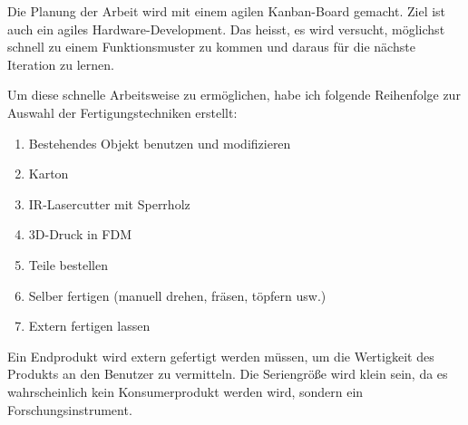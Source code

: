 

Die Planung der Arbeit wird mit einem agilen Kanban-Board gemacht. Ziel ist auch ein agiles Hardware-Development. Das heisst, es wird versucht, möglichst schnell zu einem Funktionsmuster zu kommen und daraus für die nächste Iteration zu lernen.

Um diese schnelle Arbeitsweise zu ermöglichen, habe ich folgende Reihenfolge zur Auswahl der Fertigungstechniken erstellt:

\begin{enumerate}
\item Bestehendes Objekt benutzen und modifizieren
\item Karton
\item IR-Lasercutter mit Sperrholz
\item 3D-Druck in FDM
\item Teile bestellen
\item Selber fertigen (manuell drehen, fräsen, töpfern usw.)
\item Extern fertigen lassen
\end{enumerate}

Ein Endprodukt wird extern gefertigt werden müssen, um die Wertigkeit des Produkts an den Benutzer zu vermitteln. Die Seriengröße wird klein sein, da es wahrscheinlich kein Konsumerprodukt werden wird, sondern ein Forschungsinstrument.
